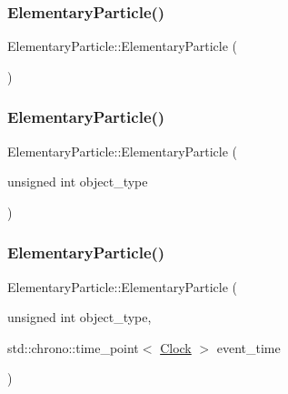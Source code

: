 \subsubsection{\texorpdfstring{Elementary\+Particle()}{ElementaryParticle()}\hspace{0.1cm}{\footnotesize\ttfamily [1/4]}}
{\footnotesize\ttfamily Elementary\+Particle\+::\+Elementary\+Particle (\begin{DoxyParamCaption}{ }\end{DoxyParamCaption})\hspace{0.3cm}{\ttfamily [inline]}}

\mbox{\label{classElementaryParticle_a6bd3ad699e15769c1860e3068020a824}} 
\subsubsection{\texorpdfstring{Elementary\+Particle()}{ElementaryParticle()}\hspace{0.1cm}{\footnotesize\ttfamily [2/4]}}
{\footnotesize\ttfamily Elementary\+Particle\+::\+Elementary\+Particle (\begin{DoxyParamCaption}\item[{unsigned int}]{object\+\_\+type }\end{DoxyParamCaption})\hspace{0.3cm}{\ttfamily [inline]}}

\mbox{\label{classElementaryParticle_a371e2742ab8b5ce0fe55ef4adbaed3af}} 
\subsubsection{\texorpdfstring{Elementary\+Particle()}{ElementaryParticle()}\hspace{0.1cm}{\footnotesize\ttfamily [3/4]}}
{\footnotesize\ttfamily Elementary\+Particle\+::\+Elementary\+Particle (\begin{DoxyParamCaption}\item[{unsigned int}]{object\+\_\+type,  }\item[{std\+::chrono\+::time\+\_\+point$<$ \mbox{\hyperlink{universe_8h_a0ef8d951d1ca5ab3cfaf7ab4c7a6fd80}{Clock}} $>$}]{event\+\_\+time }\end{DoxyParamCaption})\hspace{0.3cm}{\ttfamily [inline]}}

